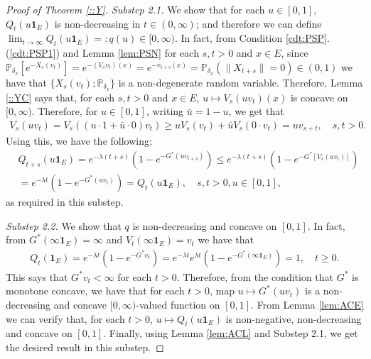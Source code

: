 \documentclass[12pt,a4paper]{amsart}
\numberwithin{equation}{section}
\theoremstyle{plain}
\theoremstyle{definition}
\theoremstyle{remark}
\begin{document}
\begin{proof}[Proof of Theorem \ref{::Y}]
\emph{Substep 2.1.} We show that for each $u \in [0,1]$, $Q_t(u \mathbf 1_E)$ is non-decreasing in $t\in (0,\infty)$; and therefore we can define $\lim_{t\to \infty} Q_t(u \mathbf 1_E)=:q(u)\in [0,\infty)$.
In fact, from Condition \ref{cdt:PSP}.(\ref{cdt:PSP1}) and  Lemma \ref{lem:PSN} for each $s,t> 0$ and $x\in E$, since $\mathbb P_{\delta_x} [e^{-X_s (v_t)}] = e^{- (V_s v_t) (x)} = e^{-v_{t+s}(x)} = \mathbb P_{\delta_x}(\|X_{t+s}\| = 0) \in (0, 1)$ we have that $\{X_s(v_t); \mathbb P_{\delta_x}\}$ is a non-degenerate random variable.
Therefore, Lemma \ref{::YC} says that, for each $s,t > 0$ and $x\in E$, $u\mapsto V_s(uv_t)(x)$ is concave on $[0,\infty)$. 
Therefore, for $u\in [0,1]$, writing $\bar u = 1- u$, we get that
\begin{align}
	V_s(uv_t)
  =V_s((u\cdot 1 + \bar u \cdot 0)v_t) 
  \geq uV_s(v_t) + \bar u V_s(0\cdot v_t) 
  = uv_{s+t},
  \quad s,t > 0.
\end{align} 
Using this, we have the following: 
\begin{align}
  & Q_{t+s}(u\mathbf 1_E) 
    = e^{- \lambda (t+s)} ( 1-e^{-G^*(uv_{t+s})} ) 
  \leq e^{- \lambda(t+s)}( 1-e^{-G^*[V_s(uv_t)]} ) \\
  & = e^{-\lambda t}( 1-e^{-G^*(uv_t)} )
    = Q_t(u\mathbf 1_E)
  , \quad s,t > 0, u \in [0,1],
\end{align}
as required in this substep.

\emph{Substep 2.2.}
We show that $q$ is non-decreasing and concave on $[0,1]$.
In fact, from $G^*(\infty \mathbf 1_E) = \infty$ and $V_t(\infty \mathbf 1_E) = v_t$ we have that
\begin{align}
  \label{eq:MY3}
	Q_t(\mathbf 1_E) = e^{- \lambda t} ( 1-e^{-G^*v_t} )
  = e^{- \lambda t} e^{\lambda t}( 1-e^{-G^*(\infty\mathbf 1_E)} )
  = 1,
  \quad t\geq 0.
\end{align}
This says that $G^*v_t < \infty$ for each $t>0$. 
Therefore, from the condition that $G^*$ is monotone concave, we have that for each $t>0$, map $u \mapsto G^*(uv_t)$ is a non-decreasing and concave $[0,\infty)$-valued function on $[0,1]$.
From Lemma \ref{lem:ACE} we can verify that, for each $t> 0$, $u \mapsto Q_t(u \mathbf 1_E)$ is non-negative, non-decreasing and concave on $[0,1]$.
Finally, using Lemma \ref{lem:ACL} and Substep 2.1, we get the desired result in this substep. 


\end{proof}
\end{document}
